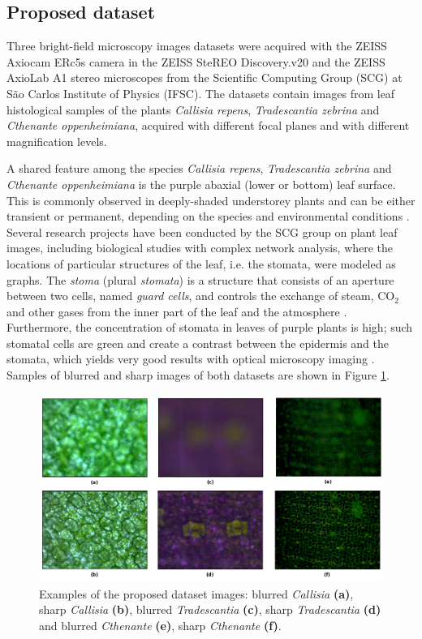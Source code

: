 \subsection{Proposed dataset}

Three bright-field microscopy images datasets were acquired with the ZEISS Axiocam ERc5s camera in the ZEISS SteREO Discovery.v20 and the ZEISS AxioLab A1 stereo microscopes from the Scientific Computing Group (SCG) at São Carlos Institute of Physics (IFSC). The datasets contain images from leaf histological samples of the plants \textit{Callisia repens}, \textit{Tradescantia zebrina} and \textit{Cthenante oppenheimiana}, acquired with different focal planes and with different magnification levels. 

A shared feature among the species \textit{Callisia repens}, \textit{Tradescantia zebrina} and \textit{Cthenante oppenheimiana} is the purple abaxial (lower or bottom) leaf surface. This is commonly observed in deeply-shaded understorey plants and can be either transient or permanent, depending on the species and environmental conditions \cite{filho2018plants}. Several research projects have been conducted by the SCG group on plant leaf images, including biological studies with complex network analysis, where the locations of particular structures of the leaf, i.e. the stomata, were modeled as graphs. The \emph{stoma} (plural \emph{stomata}) is a structure that consists of an aperture between two cells, named \emph{guard cells}, and controls the exchange of steam, CO$_{2}$ and other gases from the inner part of the leaf and the atmosphere  \cite{hetherington2003role}. Furthermore, the concentration of stomata in leaves of purple plants is high; such stomatal cells are green and create a contrast between the epidermis and the stomata, which yields very good results with optical microscopy imaging \cite{filho2018plants}. Samples of blurred and sharp images of both datasets are shown in Figure \ref{fig:datasets}.

\begin{figure}[ht]
	\centering
	\caption{Examples of the proposed dataset images: blurred \textit{Callisia} \textbf{(a)}, sharp \textit{Callisia} \textbf{(b)}, blurred \textit{Tradescantia} \textbf{(c)}, sharp \textit{Tradescantia} \textbf{(d)} and blurred \textit{Cthenante} \textbf{(e)}, sharp \textit{Cthenante} \textbf{(f)}.}
	\label{fig:datasets}
	\includegraphics[scale=0.4]{images/datasets.png}
	\centering
	\fautor
\end{figure}

